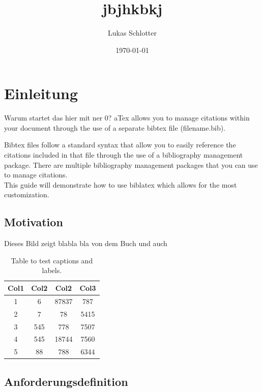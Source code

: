 \documentclass[ a4paper,
                oneside,
                toc=bibliography,
                toc=listof
                ]{scrbook}
\author{Lukas Schlotter}
\title{jbjhkbkj}
\date{\today}
\begin{document}
 
    \frontmatter
    \makeISWtitle
    
    \cleardoublepage
	\setcounter{page}{1} %

    
    \cleardoublepage
    \tableofcontents
    

    \mainmatter
    
    \chapter{Einleitung}
    Warum startet das hier mit ner 0?
    aTex allows you to manage citations within your document through the use of a separate bibtex file (filename.bib).
    
    
    \newpage
    
    Bibtex files follow a standard syntax that allow you to easily reference the citations included in that file through the use of a bibliography management package. There are multiple bibliography management packages that you can use to manage citations. \\
    This guide will demonstrate how to use biblatex which allows for the most customization.
    \section{Motivation}
    
    Dieses Bild zeigt blabla bla von dem Buch \cite{Tantau2013} und auch \cite{Kohm2013}
    
    \begin{table}[h!]
    	\centering
    	\begin{tabular}{||c c c c||} 
    		\hline
    		Col1 & Col2 & Col2 & Col3 \\ [0.5ex] 
    		\hline\hline
    		1 & 6 & 87837 & 787 \\ 
    		2 & 7 & 78 & 5415 \\
    		3 & 545 & 778 & 7507 \\
    		4 & 545 & 18744 & 7560 \\
    		5 & 88 & 788 & 6344 \\ [1ex] 
    		\hline
    	\end{tabular}
    	\caption{Table to test captions and labels.}
    	\label{table:1}
    \end{table}
	
	\section{Anforderungsdefinition}
	
\end{document}
